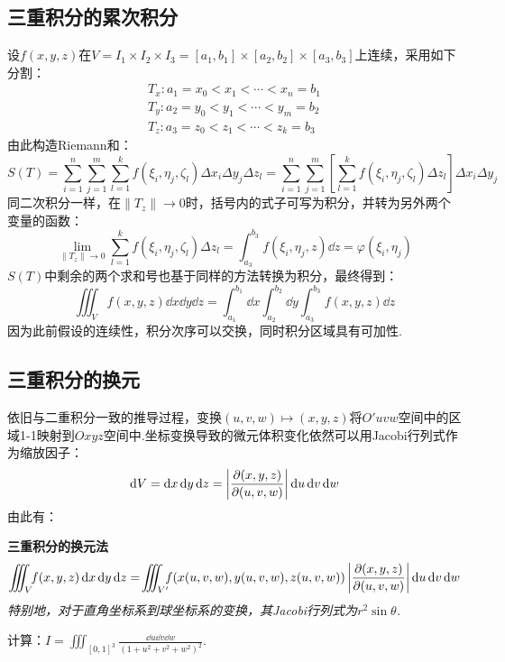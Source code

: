 \subsection{三重积分的累次积分}
设$f(x,y,z)$在$V = I_1\times I_2 \times I_3 = [a_1,b_1]\times[a_2,b_2]\times[a_3,b_3]$上连续，采用如下分割：
\begin{gather*}
    T_x:a_1 = x_0 < x_1 < \cdots < x_n = b_1 \\
    T_y:a_2 = y_0 < y_1 < \cdots < y_m = b_2 \\
    T_z:a_3 = z_0 < z_1 < \cdots < z_k = b_3
\end{gather*}
由此构造Riemann和：
\[S(T) = \sum_{i=1}^{n}\sum_{j=1}^{m}\sum_{l=1}^{k}f(\xi_i,\eta_j,\zeta_l)\Delta x_i \Delta y_j \Delta z_l 
= \sum_{i=1}^{n}\sum_{j=1}^{m}\left[\sum_{l=1}^{k}f(\xi_i,\eta_j,\zeta_l)\Delta z_l\right]\Delta x_i \Delta y_j\]
同二次积分一样，在$\left\|T_z\right\| \to 0$时，括号内的式子可写为积分，并转为另外两个变量的函数：
\[\lim_{\left\|T_z\right\|\to0}\sum_{l=1}^{k}f(\xi_i,\eta_j,\zeta_l)\Delta z_l = \int_{a_3}^{b_3}f(\xi_i,\eta_j,z)\dd{z} = \varphi(\xi_i,\eta_j)\]
$S(T)$中剩余的两个求和号也基于同样的方法转换为积分，最终得到：
\[\iiint_V f(x,y,z)\dd{x}\dd{y}\dd{z} = \int_{a_1}^{b_1}\dd{x}\int_{a_2}^{b_2}\dd{y}\int_{a_3}^{b_3}f(x,y,z)\dd{z}\]
因为此前假设的连续性，积分次序可以交换，同时积分区域具有可加性.


\subsection{三重积分的换元}
依旧与二重积分一致的推导过程，变换$(u,v,w)\mapsto(x,y,z)$将$O'uvw$空间中的区域1-1映射到$Oxyz$空间中.坐标变换导致的微元体积变化依然可以用Jacobi行列式作为缩放因子：
\[\dd{V} = \dd{x}\dd{y}\dd{z} = \left|\pdv{(x,y,z)}{(u,v,w)}\right|\dd{u}\dd{v}\dd{w}\]
由此有：
\begin{theorem}
    \textbf{三重积分的换元法}
    \[\iiint_V\!\! f(x,y,z)\dd{x}\dd{y}\dd{z} =\! \iiint_{V'}\!\!\!f(x(u,v,w),y(u,v,w),z(u,v,w))\left|\pdv{(x,y,z)}{(u,v,w)}\right|\dd{u}\dd{v}\dd{w}\]
    \textit{特别地，对于直角坐标系到球坐标系的变换，其Jacobi行列式为$r^2 \sin\theta$.}
\end{theorem}

\begin{question}
    计算：$\displaystyle I = \iiint_{[0,1]^3}\frac{\dd{u}\dd{v}\dd{w}}{(1+u^2+v^2+w^2)^2}$.
\end{question}

